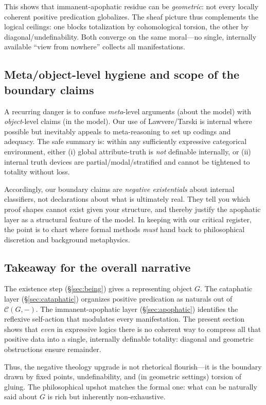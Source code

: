 \documentclass[11pt]{article}
\theoremstyle{upright}
\begin{document}
This shows that immanent-apophatic residue can be \emph{geometric}: not every locally coherent positive predication globalizes. The sheaf picture thus complements the logical ceilings: one blocks totalization by cohomological torsion, the other by diagonal/undefinability. \citep{Giraud1971, Goedel1931} Both converge on the same moral—no single, internally available “view from nowhere” collects all manifestations.

\subsection{Meta/object-level hygiene and scope of the boundary claims}
A recurring danger is to confuse \emph{meta}-level arguments (about the model) with \emph{object}-level claims (in the model). Our use of Lawvere/Tarski is internal where possible but inevitably appeals to meta-reasoning to set up codings and adequacy. The safe summary is: within any sufficiently expressive categorical environment, either (i) global attribute-truth is \emph{not} definable internally, or (ii) internal truth devices are partial/modal/stratified and cannot be tightened to totality without loss.

Accordingly, our boundary claims are \emph{negative existentials} about internal classifiers, not declarations about what is ultimately real. They tell you which proof shapes cannot exist given your structure, and thereby justify the apophatic layer as a structural feature of the model. In keeping with our critical register, the point is to chart where formal methods \emph{must} hand back to philosophical discretion and background metaphysics.

\subsection{Takeaway for the overall narrative}
The existence step (\S\ref{sec:being}) gives a representing object \(G\). The cataphatic layer (\S\ref{sec:cataphatic}) organizes positive predication as naturals out of \(\mathcal C(G,-)\). The immanent-apophatic layer (\S\ref{sec:apophatic}) identifies the reflexive self-action that modulates every manifestation. The present section shows that \emph{even} in expressive logics there is no coherent way to compress all that positive data into a single, internally definable totality: diagonal and geometric obstructions ensure remainder.

Thus, the negative theology upgrade is not rhetorical flourish—it is the boundary drawn by fixed points, undefinability, and (in geometric settings) torsion of gluing. The philosophical upshot matches the formal one: what can be naturally said about \(G\) is rich but inherently non-exhaustive.
\end{document}
